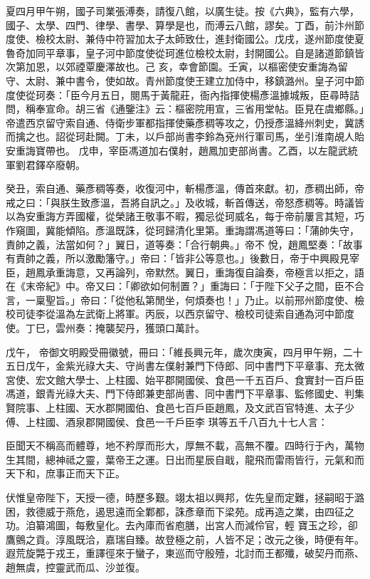 \begin{pinyinscope}
 夏四月甲午朔，國子司業張溥奏，請復八館，以廣生徒。按《六典》，監有六學，國子、太學、四門、律學、書學、算學是也，而溥云八館，謬矣。丁酉，前汴州節度使、檢校太尉、兼侍中符習加太子太師致仕，進封衛國公。戊戌，遂州節度使夏魯奇加同平章事，皇子河中節度使從珂進位檢校太尉，封開國公。自是諸道節鎮皆次第加恩，以郊禋覃慶澤故也。己
 亥，幸會節園。壬寅，以樞密使安重誨為留守、太尉、兼中書令，使如故。青州節度使王建立加侍中，移鎮潞州。皇子河中節度使從珂奏：「臣今月五日，閱馬于黃龍莊，衙內指揮使楊彥溫據城叛，臣尋時詰問，稱奉宣命。胡三省《通鑒注》云：樞密院用宣，三省用堂帖。臣見在虞鄉縣。」帝遣西京留守索自通、侍衛步軍都指揮使藥彥稠等攻之，仍授彥溫絳州刺史，冀誘而擒之也。詔從珂赴闕。丁未，以戶部尚書李鈴為兗州行軍司馬，坐引淮南覘人貽安重誨寶帶也。
 戊申，宰臣馮道加右僕射，趙鳳加吏部尚書。乙酉，以左龍武統軍劉君鐸卒廢朝。



 癸丑，索自通、藥彥稠等奏，收復河中，斬楊彥溫，傳首來獻。初，彥稠出師，帝戒之曰：「與朕生致彥溫，吾將自訊之。」及收城，斬首傳送，帝怒彥稠等。時議皆以為安重誨方弄國權，從榮諸王敬事不暇，獨忌從珂威名，每于帝前屢言其短，巧作窺圖，冀能傾陷。彥溫既誅，從珂歸清化里第。重誨謂馮道等曰：「蒲帥失守，責帥之義，法當如何？」翼日，道等奏：「合行朝典。」帝不
 悅，趙鳳堅奏：「故事有責帥之義，所以激勵籓守。」帝曰：「皆非公等意也。」後數日，帝于中興殿見宰臣，趙鳳承重誨意，又再論列，帝默然。翼日，重誨復自論奏，帝極言以拒之，語在《末帝紀》中。帝又曰：「卿欲如何制置？」重誨曰：「于陛下父子之間，臣不合言，一稟聖旨。」帝曰：「從他私第閒坐，何煩奏也！」乃止。以前邢州節度使、檢校司徒李從溫為左武衛上將軍。丙辰，以西京留守、檢校司徒索自通為河中節度使。丁巳，雲州奏：掩襲契丹，獲頭口萬計。



 戊午，
 帝御文明殿受冊徽號，冊曰：「維長興元年，歲次庚寅，四月甲午朔，二十五日戊午，金紫光祿大夫、守尚書左僕射兼門下侍郎、同中書門下平章事、充太微宮使、宏文館大學士、上柱國、始平郡開國侯、食邑一千五百戶、食實封一百戶臣馮道，銀青光祿大夫、門下侍郎兼吏部尚書、同中書門下平章事、監修國史、判集賢院事、上柱國、天水郡開國伯、食邑七百戶臣趙鳳，及文武百官特進、太子少傅、上柱國、酒泉郡開國侯、食邑一千戶臣李
 琪等五千八百九十七人言：



 臣聞天不稱高而體尊，地不矜厚而形大，厚無不載，高無不覆。四時行于內，萬物生其間，總神祗之靈，葉帝王之運。日出而星辰自戢，龍飛而雷雨皆行，元氣和而天下和，庶事正而天下正。



 伏惟皇帝陛下，天授一德，時歷多艱。翊太祖以興邦，佐先皇而定難，拯嗣昭于潞困，救德威于燕危，遏思遠而全鄴都，誅彥章而下梁苑。成再造之業，由四征之功。洎纂鴻圖，每敷皇化。去內庫而省庖膳，出宮人而減伶官，輕
 寶玉之珍，卻鷹鸇之貢。淳風既洽，嘉瑞自臻。故登極之前，人皆不足；改元之後，時便有年。遐荒旋斃于戎王，重譯徑來于蠻子，東巡而守殷殪，北討而王都殲，破契丹而燕、趙無虞，控靈武而瓜、沙並復。




\end{pinyinscope}

